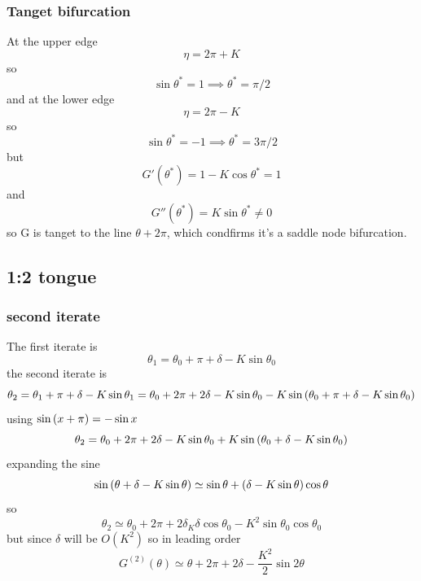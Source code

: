 \subsubsection{Tanget bifurcation}
At the upper edge 
\begin{equation}
    \eta=2\pi+K
\end{equation}
so 
\begin{equation}
    \sin\theta^*=1\implies \theta^*=\pi/2
\end{equation}
and at the lower edge 
\begin{equation}
    \eta=2\pi-K
\end{equation}
so
\begin{equation}
    \sin\theta^*=-1\implies \theta^*=3\pi/2
\end{equation}
but 
\begin{equation}
    G'(\theta^*)=1-K\cos\theta^*=1
\end{equation}
and 
\begin{equation}
    G''(\theta^*)=K\sin\theta^*\neq 0
\end{equation}
so G is tanget to the line \(\theta+2\pi\), which condfirms it's a saddle node bifurcation.
\subsection{1:2 tongue}
\subsubsection{second iterate}
The first iterate is 
\begin{equation}
    \theta_1=\theta_0+\pi+\delta-K\sin\theta_0
\end{equation}
the second iterate is 
\begin{equation}
    \theta_2 = \theta_1+\pi+\delta-K\sin\theta_1=\theta_0+2\pi+2\delta-K\sin\theta_0-K\sin\left(\theta_0+\pi+\delta-K\sin\theta_0\right)
\end{equation}
using \(\sin\left(x+\pi\right)=-\sin x\)
\begin{equation}
    \theta_2=\theta_0+2\pi+2\delta-K\sin\theta_0+K\sin\left(\theta_0+\delta-K\sin\theta_0\right)
\end{equation}
expanding the sine 
\begin{equation}
    \sin\left(\theta+\delta-K\sin\theta\right)\simeq \sin\theta+\left(\delta-K\sin\theta\right)\cos\theta
\end{equation}
so 
\begin{equation}
    \theta_2\simeq\theta_0+2\pi+2\delta_K\delta\cos\theta_0-K^2\sin\theta_0\cos\theta_0
\end{equation}
but since \(\delta\) will be \(O(K^2)\) so in leading order 
\begin{equation}
    G^{(2)}(\theta)\simeq \theta+2\pi+2\delta-\frac{K^2}{2}\sin 2\theta
\end{equation}
